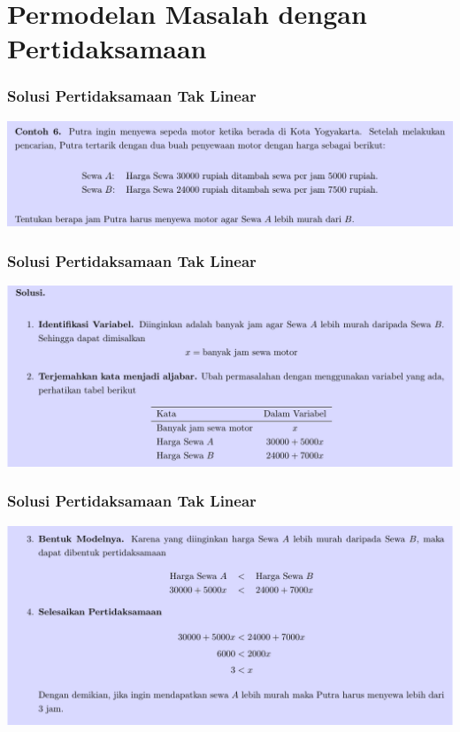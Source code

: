 \documentclass[pdflatex,compress,mathserif]{beamer}
\begin{document}
\section{Permodelan Masalah dengan Pertidaksamaan}

\begin{frame}
	\frametitle{Solusi Pertidaksamaan Tak Linear}
	\begin{center}
		\includegraphics[width=\linewidth]{img/img13}
	\end{center}
\end{frame}

\begin{frame}
	\frametitle{Solusi Pertidaksamaan Tak Linear}
	\begin{center}
		\includegraphics[width=\linewidth]{img/img14}
	\end{center}
\end{frame}

\begin{frame}
	\frametitle{Solusi Pertidaksamaan Tak Linear}
	\begin{center}
		\includegraphics[width=\linewidth]{img/img15}
	\end{center}
\end{frame}
\end{document}
